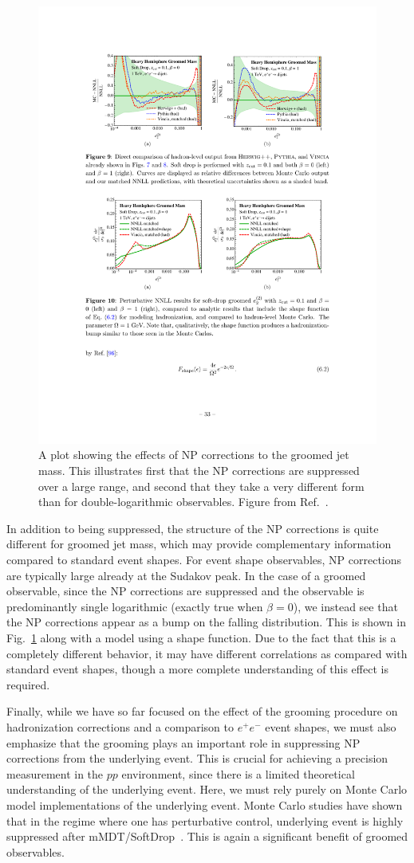 \documentclass[11pt]{cernrep}
\begin{document}
\begin{figure}[t]
\begin{center}
\includegraphics[width = 0.5\columnwidth]{jetsub_alphas_shape_function.pdf}
\end{center}
\caption{A plot showing the effects of NP corrections to the groomed jet mass. This illustrates first that the NP corrections are suppressed over a large range, and second that they take a very different form than for double-logarithmic observables. Figure from Ref.~\cite{Frye:2016aiz}.}
\label{jetsub_alphas_fig:shape_function}
\end{figure}

In addition to being suppressed, the structure of the NP corrections is quite different for groomed jet mass, which may provide complementary information compared to standard event shapes.
%
For event shape observables, NP corrections are typically large already at the Sudakov peak.
%
In the case of a groomed observable, since the NP corrections are suppressed and the observable is predominantly single logarithmic (exactly true when $\beta=0$), we instead see that the NP corrections appear as a bump on the falling distribution.
%
This is shown in Fig.~\ref{jetsub_alphas_fig:shape_function} along with a model using a shape function.
%
Due to the fact that this is a completely different behavior, it may have different correlations as compared with standard event shapes, though a more complete understanding of this effect is required. 

Finally, while we have so far focused on the effect of the grooming procedure on hadronization corrections and a comparison to $e^+e^-$ event shapes, we must also emphasize that the grooming plays an important role in suppressing NP corrections from the underlying event.
%
This is crucial for achieving a precision measurement in the $pp$ environment, since there is a limited theoretical understanding of the underlying event.
%
Here, we must rely purely on Monte Carlo model implementations of the underlying event.
%
Monte Carlo studies have shown that in the regime where one has perturbative control, underlying event is highly suppressed after mMDT/SoftDrop~\cite{Dasgupta:2013ihk,Larkoski:2014wba}.
%
This is again a significant benefit of groomed observables. 
\end{document}
